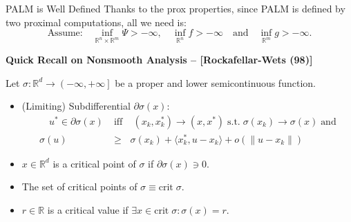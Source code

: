 \documentclass[9pt,handout]{beamer} %
\newcommand{\s}{\sigma}
\newcommand{\rr}{\mathbb{R}} %
\begin{document}
	\begin{frame}{PALM is Well Defined}
        Thanks to the prox properties, since PALM is defined by two proximal computations, 
        all we need is:
        \begin{equation*}
            \text{Assume:} \quad \inf_{\rr^{n} \times \rr^{m}} \Psi > -\infty, \quad 
            \inf_{\rr^{n}} f > -\infty \quad \text{and} \quad \inf_{\rr^{m}} g > -\infty.
        \end{equation*}
        \pause
        \begin{center}
        \end{center}
        \pause
        {\bf\dblue Quick Recall on Nonsmooth Analysis -- [Rockafellar-Wets (98)]}
		\medskip
		
        Let $\s: \rr^{d} \rightarrow \left(-\infty , +\infty\right]$ be a proper and lower 
        semicontinuous function.

        \begin{itemize}
            \item {\dblue (Limiting) Subdifferential} $\partial \s\left(x\right)$:
	            \begin{eqnarray*}
		             \quad u^* \in \partial \s (x)\; &\mbox{iff}& \;  (x_k,x_k^*) \to  
		             (x,x^*)\;
	    	         \mbox{s.t.}\;  \s(x_k) \to \s(x)\; \mbox{and}\\
    	    	     \s (u) &\geq &\s (x_k) +  \langle x^*_k, u -x_k \rangle + o( \|u-x_k\|)
        	     \end{eqnarray*}
             \item $x \in \rr^{d}$ is a {\dblue critical} point  of $\s $ if $\partial \s(x) 
            	 \ni 0$.
			\item The set of critical points of $\s \equiv\mbox{crit} \;\s .$
			\item $r\in \rr$ is a critical value if $\exists x \in \mbox{crit}\;\s : 
				\s(x)=r$.
        \end{itemize}
	\end{frame}
\end{document}
